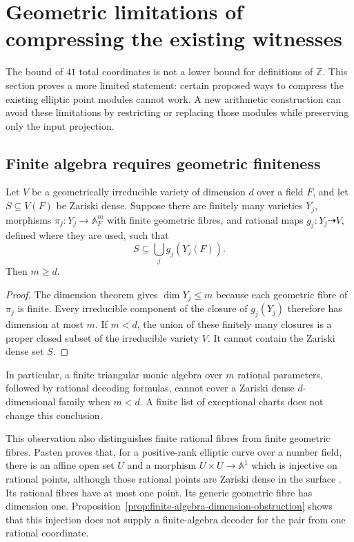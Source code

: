 \section{Geometric limitations of compressing the existing witnesses}
\label{sec:geometric-compression-limits}

The bound of $41$ total coordinates is not a lower bound for
definitions of $\mathbb Z$.  This section proves a more limited
statement: certain proposed ways to compress the existing elliptic
point modules cannot work.  A new arithmetic construction can avoid
these limitations by restricting or replacing those modules while
preserving only the input projection.

\subsection{Finite algebra requires geometric finiteness}

\begin{proposition}\label{prop:finite-algebra-dimension-obstruction}
Let $V$ be a geometrically irreducible variety of dimension $d$ over
a field $F$, and let $S\subseteq V(F)$ be Zariski dense.  Suppose
there are finitely many varieties $Y_j$, morphisms
$\pi_j:Y_j\longrightarrow\mathbb A_F^m$ with finite geometric
fibres, and rational maps $g_j:Y_j\dashrightarrow V$, defined
where they are used, such that
\[
                         S\subseteq\bigcup_jg_j(Y_j(F)).
\]
Then $m\ge d$.
\end{proposition}
\begin{proof}
The dimension theorem gives $\dim Y_j\le m$ because each
geometric fibre of $\pi_j$ is finite.  Every irreducible component
of the closure of $g_j(Y_j)$ therefore has dimension at most $m$.
If $m<d$, the union of these finitely many closures is a proper
closed subset of the irreducible variety $V$.  It cannot contain
the Zariski dense set $S$.
\end{proof}

In particular, a finite triangular monic algebra over $m$ rational
parameters, followed by rational decoding formulas, cannot cover
a Zariski dense $d$-dimensional family when $m<d$.  A finite list
of exceptional charts does not change this conclusion.

This observation also distinguishes finite rational fibres from
finite geometric fibres.  Pasten proves that, for a positive-rank
elliptic curve over a number field, there is an affine open set
$U$ and a morphism $U\times U\to\mathbb A^1$ which is injective
on rational points, although those rational points are Zariski
dense in the surface \cite[Corollary 1.2]{P3Pasten2020}.
Its rational fibres have at most one point.  Its generic geometric
fibre has dimension one.  Proposition~\ref{prop:finite-algebra-dimension-obstruction}
shows that this injection does not supply a finite-algebra decoder
for the pair from one rational coordinate.

